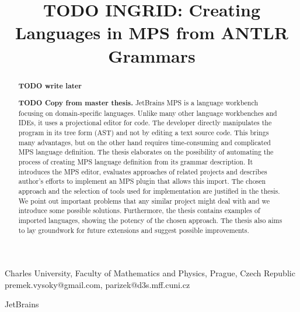 \documentclass[10pt]{sigplanconf}
\newcommand{\todo}[1]{{\bfseries TODO #1}}
\begin{document}


\title{\todo{INGRID: Creating Languages in MPS from ANTLR Grammars}}


	{Charles University, Faculty of Mathematics and Physics, Prague, Czech Republic}
	{premek.vysoky@gmail.com, parizek@d3s.mff.cuni.cz}

	{JetBrains}


\maketitle

\begin{abstract}
\todo{write later}

\todo{Copy from master thesis.}
JetBrains MPS is a language workbench focusing on domain-specific languages.
Unlike many other language workbenches and IDEs, it uses a projectional editor for code.
The developer directly manipulates the program in its tree form (AST) and not by editing a text source code.
This brings many advantages, but on the other hand requires time-consuming and complicated MPS language definition.
The thesis elaborates on the possibility of automating the process of creating MPS language definition from its grammar description.
It introduces the MPS editor, evaluates approaches of related projects and describes author's efforts to implement an MPS plugin that allows this import.
The chosen approach and the selection of tools used for implementation are justified in the thesis.
We point out important problems that any similar project might deal with and we introduce some possible solutions.
Furthermore, the thesis contains examples of imported languages, showing the potency of the chosen approach.
The thesis also aims to lay groundwork for future extensions and suggest possible improvements.
\end{abstract}








\end{document}
